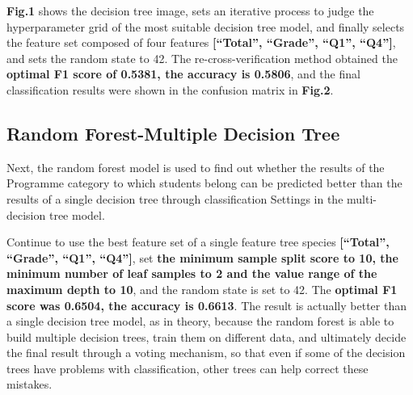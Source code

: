 \documentclass[twocolumn]{IEEEtran}
\begin{document}
\textbf{Fig.1} shows the decision tree image, sets an iterative process to judge the hyperparameter grid of the most suitable decision tree model, and finally selects the feature set composed of four features \textbf{[``Total'', ``Grade'', ``Q1'', ``Q4'']}, and sets the random state to 42. The re-cross-verification method obtained the \textbf{optimal F1 score of 0.5381, the accuracy is 0.5806}, and the final classification results were shown in the confusion matrix in \textbf{Fig.2}. 

\subsection{Random Forest-Multiple Decision Tree}
Next, the random forest model is used to find out whether the results of the Programme category to which students belong can be predicted better than the results of a single decision tree through classification Settings in the multi-decision tree model.

Continue to use the best feature set of a single feature tree species \textbf{[``Total'', ``Grade'', ``Q1'', ``Q4'']}, set \textbf{the minimum sample split score to 10, the minimum number of leaf samples to 2 and the value range of the maximum depth to 10}, and the random state is set to 42. The \textbf{optimal F1 score was 0.6504, the accuracy is 0.6613}. The result is actually better than a single decision tree model, as in theory, because the random forest is able to build multiple decision trees, train them on different data, and ultimately decide the final result through a voting mechanism, so that even if some of the decision trees have problems with classification, other trees can help correct these mistakes.

\end{document}
